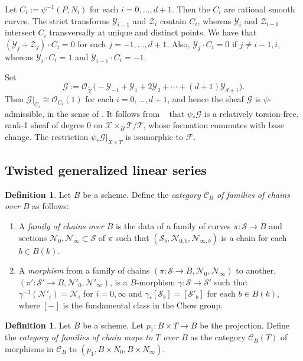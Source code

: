 \documentclass[a4paper,11pt]{amsart}
\theoremstyle{plain}
\theoremstyle{definition}
\newtheorem{defn}[thm]{Definition}
\theoremstyle{remark}
\def\O{\mathcal{O}}
\def\:{\colon}
\begin{document}
Let $C_i:=\psi^{-1}(P,N_i)$ for each $i=0,\dots,d+1$. Then the
$C_i$ are rational smooth curves. 
The strict transforms $\mathcal Y_{i-1}$ and $\mathcal Z_i$ contain $C_i$, 
whereas $\mathcal Y_{i}$ and $\mathcal Z_{i-1}$ intersect $C_i$
transversally at unique and distinct points. We have that 
$(\mathcal Y_j+\mathcal Z_j)\cdot C_i=0$ for each $j=-1,\dots,d+1$. Also, $\mathcal Y_j\cdot C_i=0$ if $j\neq i-1,i$, whereas $\mathcal Y_i\cdot C_i=1$ and $\mathcal Y_{i-1}\cdot C_i=-1$.

Set
$$
\mathcal{G}:=\O_{\widetilde{\mathcal{X}}}
\Big(-\mathcal Y_{-1}+\mathcal Y_1+2\mathcal
Y_2+\cdots+(d+1)\mathcal Y_{d+1}\Big).
$$
Then $\mathcal{G}|_{C_i}\cong\O_{C_i}(1)$ for each
$i=0,\dots,d+1$, and hence the sheaf $\mathcal G$ is $\psi$-admissible, in the sense of \cite[\S~3]{EP}. It follows from ~\cite[Thm. 3.1, p.~63]{EP} that $\psi_{\ast}\mathcal{G}$ is a relatively torsion-free, rank-1 sheaf of degree 0 on
$\mathcal{X}\times_B\mathcal{T}/\mathcal{T}$, whose
formation commutes with base change. The restriction $\psi_{\ast}\mathcal{G}|_{X\times T}$ is isomorphic to $\mathcal F$.

\subsection{Twisted generalized linear series}

\begin{defn}
Let $B$ be a scheme. Define the \emph{category $\mathcal C_B$ of families of chains over $B$} as follows:
\begin{enumerate}
    \item A \emph{family of chains over $B$} is the data of a family of curves $\pi\:\mathcal S\to B$ and sections $\mathcal N_0,\mathcal N_\infty\subset\mathcal S$ of $\pi$ such that $(\mathcal S_b,\mathcal N_{0,b},\mathcal N_{\infty,b})$ is a chain for each $b\in B(k)$. 
    \item A \emph{morphism} from a family of chains $(\pi\colon\mathcal S\to B,\mathcal N_0,\mathcal N_\infty)$ to another, $(\pi'\colon\mathcal S'\to B,\mathcal N'_0,\mathcal N'_\infty)$, is a $B$-morphism $\gamma\:\mathcal S\to\mathcal S'$ such that $\gamma^{-1}(\mathcal N'_i)=\mathcal N_i$ for $i=0,\infty$ and $\gamma_*[\mathcal S_b]=[\mathcal S'_b]$ for each $b\in B(k)$, where $[-]$ is the fundamental class in the Chow group.
\end{enumerate}
\end{defn}

\begin{defn} Let $B$ be a scheme. Let $p_1\: B\times T \to B$ be the projection. Define the \emph{category of families of chain maps to $T$ over $B$} as the category $\mathcal C_B(T)$ of morphisms in $\mathcal C_B$ to $(p_1,B\times N_0,B\times N_{\infty})$. 
\end{defn}
\end{document}
